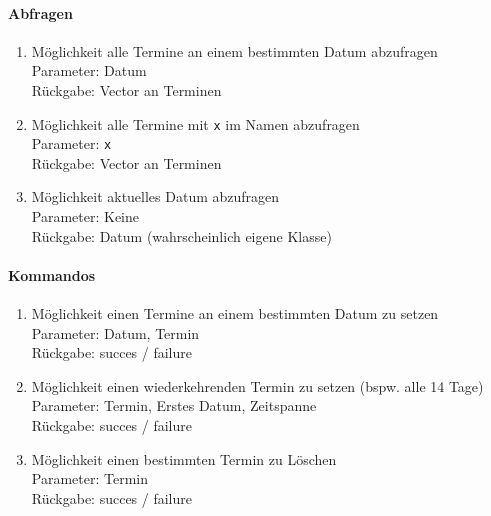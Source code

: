 \documentclass{article}
\begin{document}
    \paragraph{Abfragen}
    \begin{enumerate}
        \item {Möglichkeit alle Termine an einem bestimmten Datum abzufragen\\
        Parameter: Datum\\
        Rückgabe: Vector an Terminen}
        \item {Möglichkeit alle Termine mit \verb|x| im Namen abzufragen\\
        Parameter: \verb|x|\\
        Rückgabe: Vector an Terminen}
        \item {Möglichkeit aktuelles Datum abzufragen\\
        Parameter: Keine\\
        Rückgabe: Datum (wahrscheinlich eigene Klasse)}
    \end{enumerate}
    \paragraph{Kommandos}
    \begin{enumerate}
        \item {Möglichkeit einen Termine an einem bestimmten Datum zu setzen\\
        Parameter: Datum, Termin\\
        Rückgabe: succes / failure}
        \item {Möglichkeit einen wiederkehrenden Termin zu setzen (bspw. alle 14 Tage)\\
        Parameter: Termin, Erstes Datum, Zeitspanne\\
        Rückgabe: succes / failure}
        \item {Möglichkeit einen bestimmten Termin zu Löschen\\
        Parameter: Termin\\
        Rückgabe: succes / failure}
    \end{enumerate}
    \newpage
\end{document}
